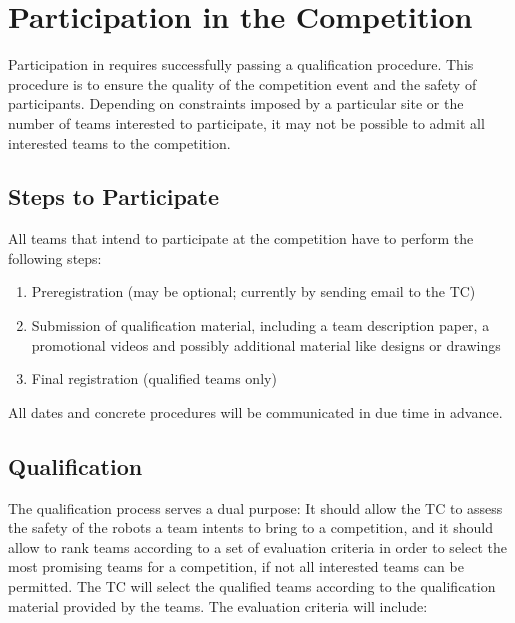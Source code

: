 \section{Participation in the Competition}\label{sec:participation_in_the_competition}
Participation in \RCAW requires successfully passing a qualification procedure. This procedure is to ensure the quality of the competition event and the safety of participants. Depending on constraints imposed by a particular site or the number of teams interested to participate, it may not be possible to admit all interested teams to the competition.


\subsection{Steps to Participate}
All teams that intend to participate at the competition have to perform the following steps:

\begin{enumerate}
	\item Preregistration (may be optional; currently by sending email to the TC)
	\item Submission of qualification material, including a team description paper, a promotional videos and possibly additional material like designs or drawings
	\item Final registration (qualified teams only)
\end{enumerate}


All dates and concrete procedures will be communicated in due time in advance.

\subsection{Qualification}
The qualification process serves a dual purpose: It should allow the TC to assess the safety of the robots a team intents to bring to a competition, and it should allow to rank teams according to a set of evaluation criteria in order to select the most promising teams for a competition, if not all interested teams can be permitted. The TC will select the qualified teams according to the qualification material provided by the teams. The evaluation criteria will include:

